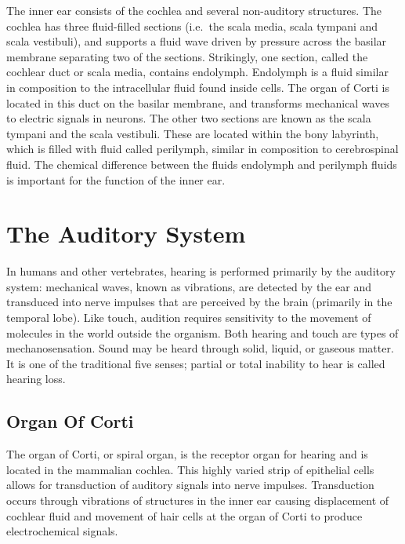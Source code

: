 The inner ear consists of the cochlea and several non-auditory structures. The cochlea has three fluid-filled sections (i.e.~the scala media, scala tympani and scala vestibuli), and supports a fluid wave driven by pressure across the basilar membrane separating two of the sections. Strikingly, one section, called the cochlear duct or scala media, contains endolymph. Endolymph is a fluid similar in composition to the intracellular fluid found inside cells. The organ of Corti is located in this duct on the basilar membrane, and transforms mechanical waves to electric signals in neurons. The other two sections are known as the scala tympani and the scala vestibuli. These are located within the bony labyrinth, which is filled with fluid called perilymph, similar in composition to cerebrospinal fluid. The chemical difference between the fluids endolymph and perilymph fluids is important for the function of the inner ear.

\hypertarget{the-auditory-system}{%
\section{The Auditory System}\label{the-auditory-system}}

In humans and other vertebrates, hearing is performed primarily by the auditory system: mechanical waves, known as vibrations, are detected by the ear and transduced into nerve impulses that are perceived by the brain (primarily in the temporal lobe). Like touch, audition requires sensitivity to the movement of molecules in the world outside the organism. Both hearing and touch are types of mechanosensation. Sound may be heard through solid, liquid, or gaseous matter. It is one of the traditional five senses; partial or total inability to hear is called hearing loss.

\hypertarget{organ-of-corti}{%
\subsection{Organ Of Corti}\label{organ-of-corti}}

The organ of Corti, or spiral organ, is the receptor organ for hearing and is located in the mammalian cochlea. This highly varied strip of epithelial cells allows for transduction of auditory signals into nerve impulses. Transduction occurs through vibrations of structures in the inner ear causing displacement of cochlear fluid and movement of hair cells at the organ of Corti to produce electrochemical signals.

